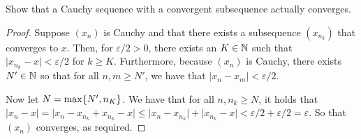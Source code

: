 \begin{exercise}{15}
Show that a Cauchy sequence with a convergent subsequence actually converges.
\end{exercise}
\begin{proof}
Suppose $(x_n)$ is Cauchy and that there exists a subsequence $(x_{n_{k}})$ that converges to $x$. Then, for $\varepsilon/2>0$, there exists an $K\in\mathbb{N}$ such that $\lvert x_{n_{k}}-x\rvert<\varepsilon/2$ for $k\geq K$. Furthermore, because $(x_n)$ is Cauchy, there exists $N'\in\mathbb{N}$ so that for all $n,m\geq N'$, we have that $\lvert x_n-x_m\rvert<\varepsilon/2$. 

Now let $N=\max\{N', n_K\}$. We have that for all $n,n_k\geq N$, it holds that $\lvert x_n-x\rvert= \lvert x_n-x_{n_k}+x_{n_k}-x\rvert\leq\lvert x_n-x_{n_k}\rvert+\lvert x_{n_k}-x\rvert <\varepsilon/2+\varepsilon/2=\varepsilon$. So that $(x_n)$ converges, as required.
\end{proof}

